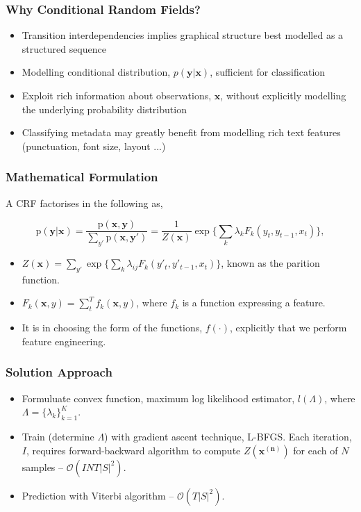 \documentclass{beamer}
\newcommand{\p}{\text{p}}
\begin{document}

\begin{frame}
\frametitle{Why Conditional Random Fields?}
\begin{itemize}
\item Transition interdependencies implies graphical structure best modelled as a structured sequence
\item Modelling conditional distribution, $p(\textbf{y}|\textbf{x})$, sufficient for classification
\item Exploit rich information about observations, $\textbf{x}$, without explicitly modelling the underlying probability distribution
\item Classifying metadata may greatly benefit from modelling rich text features (punctuation, font size, layout ...)
\end{itemize}
\end{frame}


\begin{frame}
\frametitle{Mathematical Formulation}

A CRF factorises in the following as,

$$
\p(\textbf{y}|\textbf{x}) = \frac{\p(\textbf{x}, \textbf{y})}{\sum_{y'}{\p(\textbf{x}, \textbf{y}')}} = \frac{1}{Z(\mathbf{x})}\exp \Bigg\{\sum_k{
\lambda_{k}F_{k}(y_t, y_{t-1}, x_t)
}\Bigg\},
$$



\begin{itemize}
\item  $Z(\mathbf{x}) = \sum_{y'}\exp \Big\{\sum_k{\lambda_{ij}F_{k}(y'_t, y'_{t-1}, x_t)}\Big\}$, known as the parition function.
\item $F_k(\mathbf{x}, y) = \sum_t^T f_k(\mathbf{x}, y)$, where $f_k$ is a function expressing a feature.
\item It is in choosing the form of the functions, $f(\cdot)$, explicitly that we perform feature engineering.
\end{itemize}

\end{frame}


\begin{frame}
\frametitle{Solution Approach}
\begin{itemize}
\item Formuluate convex function, maximum log likelihood estimator, $l(\Lambda)$, where $\Lambda = \{\lambda_k\}_{k=1}^K$.
\item Train (determine $\Lambda$) with gradient ascent technique, L-BFGS. Each iteration, $I$, requires forward-backward algorithm to compute $Z(\mathbf{x^{(n)}})$ for each of $N$ samples -- $\mathcal{O}(INT|S|^2)$.
\item Prediction with Viterbi algorithm -- $\mathcal{O}(T|S|^2)$.
\end{itemize}
\end{frame}
\end{document}
